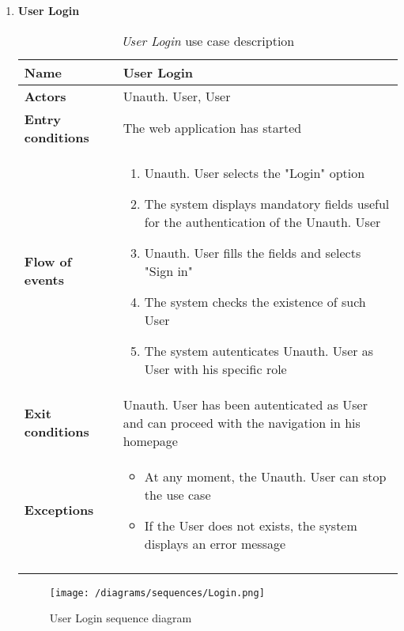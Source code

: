 \begin{enumerate}
				\FloatBarrier
			\item \textbf{User Login}
				\begin{longtable}{p{0.26\linewidth}p{0.75\linewidth}}
					\toprule
					\textbf{Name} & \textbf{User Login} \\
					\midrule
					\textbf{Actors} & Unauth. User, User \\
					\midrule
					\textbf{Entry conditions} & The web application has started \\
					\midrule
					\textbf{Flow of events} & 
					\begin{enumerate}
						\item Unauth. User selects the "Login" option
						\item The system displays mandatory fields useful for the authentication of the Unauth. User
						\item Unauth. User fills the fields and selects "Sign in"
						\item The system checks the existence of such User
						\item The system autenticates Unauth. User as User with his specific role
					\end{enumerate} \\
					\midrule
					\textbf{Exit conditions} &  Unauth. User has been autenticated as User and can proceed with the navigation in his homepage\\
					\midrule
					\textbf{Exceptions} & 
					\begin{itemize}
						\item  At any moment, the Unauth. User can stop the use case
						\item If the User does not exists, the system displays an error message		
					\end{itemize} \\
					\bottomrule
					\caption{\emph{User Login} use case description}
				\end{longtable}
			
				\begin{figure}[h]
					\centering
					\texttt{[image: /diagrams/sequences/Login.png]}
					\caption{User Login sequence diagram}
				\end{figure}
			

\end{enumerate}
